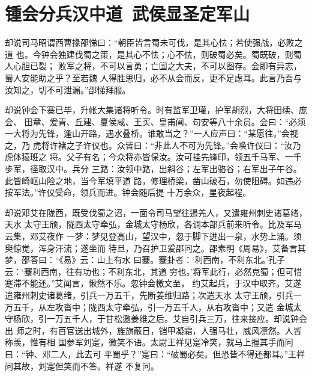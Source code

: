 \chapter{锺会分兵汉中道~武侯显圣定军山}

却说司马昭谓西曹掾邵悌曰：“朝臣皆言蜀未可伐，是其心怯；若使强战，必败之道
也。今钟会独建伐蜀之策，是其心不怯；心不怯，则破蜀必矣。蜀既破，则蜀人心胆已裂；
败军之将，不可以言勇；亡国之大夫，不可以图存。会即有异志，蜀人安能助之乎？至若魏
人得胜思归，必不从会而反，更不足虑耳。此言乃吾与汝知之，切不可泄漏。”邵悌拜服。

却说钟会下寨已毕，升帐大集诸将听令。时有监军卫瓘，护军胡烈，大将田续、庞会、
田章、爰青、丘建、夏侯咸、王买、皇甫闿、句安等八十余员。会曰：“必须
一大将为先锋，逢山开路，遇水叠桥。谁敢当之？”一人应声曰：“某愿往。”会视之，乃
虎将许褚之子许仪也。众皆曰：“非此人不可为先锋。”会唤许仪曰：“汝乃虎体猿班之
将。父子有名；今众将亦皆保汝。汝可挂先锋印，领五千马军、一千步军，径取汉中。兵分
三路：汝领中路，出斜谷；左军出骆谷；右军出子午谷。此皆崎岖山险之地，当今军填平道
路，修理桥梁，凿山破石，勿使阻碍。如违必按军法。”许仪受命，领兵而进。钟会随后提
十万余众，星夜起程。

却说邓艾在陇西，既受伐蜀之诏，一面令司马望往遏羌人，又遣雍州刺史诸葛绪，天水
太守王颀，陇西太守牵弘，金城太守杨欣，各调本部兵前来听令。比及军马云集，邓艾夜作
一梦：梦见登高山，望汉中，忽于脚下迸出一泉，水势上涌。须臾惊觉，浑身汗流；遂坐而
待旦，乃召护卫爰邵问之。邵素明《周易》，艾备言其梦，邵答曰：“《易》云：山上有水
曰蹇。蹇卦者：‘利西南，不利东北。’孔子云：‘蹇利西南，往有功也；不利东北，其道
穷也。’将军此行，必然克蜀；但可惜蹇滞不能还。”艾闻言，愀然不乐。忽钟会檄文至，
约艾起兵，于汉中取齐。艾遂遣雍州刺史诸葛绪，引兵一万五千，先断姜维归路；次遣天水
太守王颀，引兵一万五千，从左攻沓中；陇西太守牵弘，引一万五千人，从右攻沓中；又遣
金城太守杨欣，引一万五千人，于甘松邀姜维之后。艾自引兵三万，往来接应。却说钟会出
师之时，有百官送出城外，旌旗蔽日，铠甲凝霜，人强马壮，威风凛然。人皆称羡，惟有相
国参军刘寔，微笑不语。太尉王祥见寔冷笑，就马上握其手而问曰：“钟、邓二人，此去可
平蜀乎？”寔曰：“破蜀必矣。但恐皆不得还都耳。”王祥问其故，刘寔但笑而不答。祥遂
不复问。


